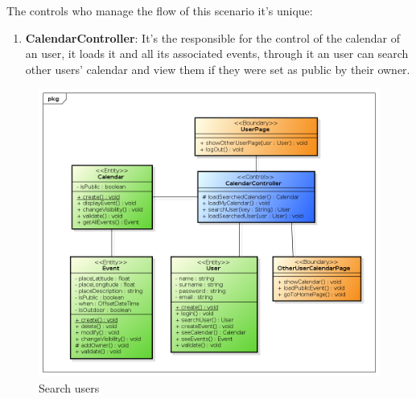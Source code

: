The controls who manage the flow of this scenario it's unique:\begin{enumerate}
\item {\bf CalendarController}: It's the responsible for the control of the calendar of an user, it loads it and all its associated events, through it an user can search other users' calendar and view them if they were set as public by their owner.

\end{enumerate}
\begin{center}
 \begin{figure}[H]
    \includegraphics[width=1\textwidth]{../BCEDiagram/BCE/EntityOverview/SearchUserBCE.png}
    \caption{Search users}
     \label{fig:searchBCE}
     \end{figure}
   \end{center} 
  
  
